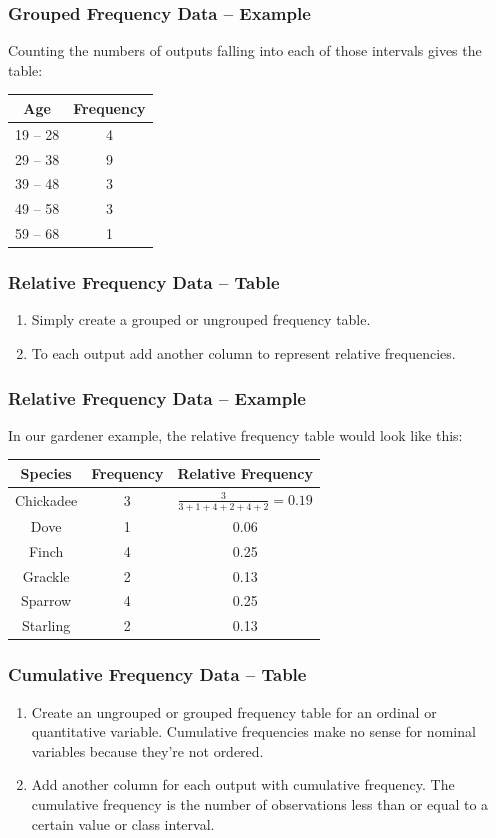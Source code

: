 \documentclass[aspectratio=169,11pt,svgnames]{beamer}
\begin{document}
\begin{frame}
 \frametitle{Grouped Frequency Data -- Example}
 Counting the numbers of outputs falling into each of those intervals gives the
 table:
 \begin{center}
  \begin{tabular}{c|c}
   \textbf{Age} & \textbf{Frequency}\\
   \toprule
   19 -- 28 & 4\\
   29 -- 38 & 9\\
   39 -- 48 & 3\\
   49 -- 58 & 3\\
   59 -- 68 & 1
  \end{tabular}
 \end{center}
\end{frame}

\begin{frame}
 \frametitle{Relative Frequency Data -- Table}
 \begin{enumerate}
  \item Simply create a grouped or ungrouped frequency table.
  \pause
  \item To each output add another column to represent \alert{relative
   frequencies}.
 \end{enumerate}
\end{frame}

\begin{frame}
 \frametitle{Relative Frequency Data -- Example}
 In our gardener example, the relative frequency table would look like this:
 \begin{center}
  \begin{tabular}{c|c|c}
   \textbf{Species} & \textbf{Frequency} & \textbf{Relative Frequency}\\
   \toprule
   Chickadee & 3 & $\frac{3}{3 + 1 + 4 + 2 + 4 + 2} = 0.19$\\
   Dove & 1 & 0.06\\
   Finch & 4 & 0.25\\
   Grackle & 2 & 0.13\\
   Sparrow & 4 & 0.25\\
   Starling & 2 & 0.13
  \end{tabular}
 \end{center}
\end{frame}

\begin{frame}
 \frametitle{Cumulative Frequency Data -- Table}
 \begin{enumerate}
  \item Create an ungrouped or grouped frequency table for \alert{an ordinal or
   quantitative variable}. Cumulative frequencies make no sense for nominal
   variables because they're not ordered.
  \pause
  \item Add another column for each output with \alert{cumulative frequency}.
   The cumulative frequency is the number of observations less than or equal to
   a certain value or class interval.
 \end{enumerate}
\end{frame}
\end{document}
